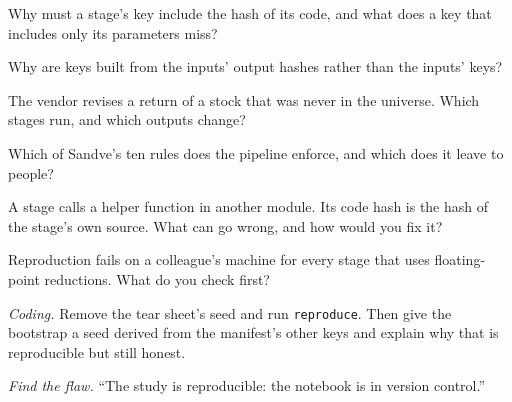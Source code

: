 \begin{exercise}[$\star$]\label{exo:rs:build-a-research-workflow:1}
Why must a stage's key include the hash of its code, and what does a key that includes only its parameters miss?
\end{exercise}

\begin{exercise}[$\star$]\label{exo:rs:build-a-research-workflow:2}
Why are keys built from the inputs' output hashes rather than the inputs' keys?
\end{exercise}

\begin{exercise}[$\star$]\label{exo:rs:build-a-research-workflow:3}
The vendor revises a return of a stock that was never in the universe. Which stages run, and which outputs change?
\end{exercise}

\begin{exercise}[$\star\star$]\label{exo:rs:build-a-research-workflow:4}
Which of Sandve's ten rules does the pipeline enforce, and which does it leave to people?
\end{exercise}

\begin{exercise}[$\star\star$]\label{exo:rs:build-a-research-workflow:5}
A stage calls a helper function in another module. Its code hash is the hash of the stage's own source. What can go wrong, and how would you fix it?
\end{exercise}

\begin{exercise}[$\star\star$]\label{exo:rs:build-a-research-workflow:6}
Reproduction fails on a colleague's machine for every stage that uses floating-point reductions. What do you check first?
\end{exercise}

\begin{exercise}[$\star\star\star$]\label{exo:rs:build-a-research-workflow:7}
\emph{Coding.} Remove the tear sheet's seed and run \texttt{reproduce}. Then give the bootstrap a seed derived from the manifest's other keys and explain why that is
reproducible but still honest.
\end{exercise}

\begin{exercise}[$\star\star\star$]\label{exo:rs:build-a-research-workflow:8}
\emph{Find the flaw.} ``The study is reproducible: the notebook is in version control.''
\end{exercise}

